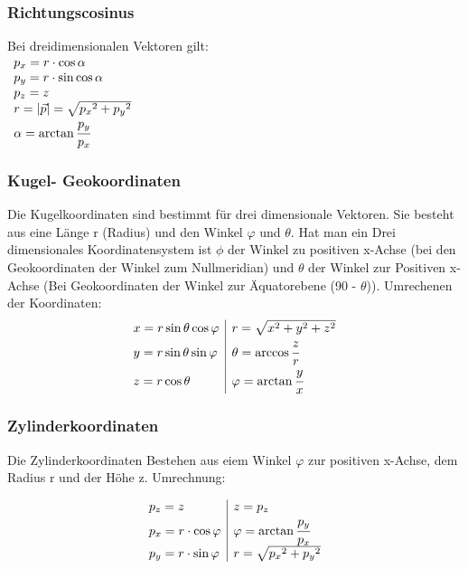 \documentclass[a4paper,10pt]{scrartcl}
\begin{document}
            \subsubsection{Richtungscosinus}
                Bei dreidimensionalen Vektoren gilt: \\
                $\begin{array}{l}
                    p_x = r \cdot \cos \alpha \\
                    p_y = r \cdot \sin \cos \alpha \\
                    p_z = z\\
                    r = |\vec p| = \sqrt{{p_x}^2 + {p_y}^2} \\
                    \alpha = \arctan \cfrac{p_y}{p_x}
                \end{array}$
            \subsubsection{Kugel- Geokoordinaten}
            Die Kugelkoordinaten sind bestimmt für drei dimensionale Vektoren. Sie besteht aus eine Länge r (Radius) und den Winkel $\varphi$ und $\theta$. Hat man ein Drei dimensionales
            Koordinatensystem ist $\phi$ der Winkel zu positiven x-Achse (bei den Geokoordinaten der Winkel zum Nullmeridian) und $\theta$ der Winkel zur Positiven x-Achse 
            (Bei Geokoordinaten der Winkel zur Äquatorebene (90 - $\theta$)). Umrechenen der Koordinaten:
            \[
                \begin{array}{l|l}
                    x = r \sin \theta \cos \varphi & r = \sqrt{x^2 + y^2 + z^2} \\
                    y = r \sin \theta \sin \varphi & \theta = \arccos \cfrac{z}{r} \\
                    z = r \cos \theta & \varphi = \arctan \cfrac{y}{x}
                \end{array}
            \]
            \subsubsection{Zylinderkoordinaten}
            Die Zylinderkoordinaten Bestehen aus eiem Winkel $\varphi$ zur positiven x-Achse, dem Radius r und der Höhe z. Umrechnung:

            \[
                \begin{array}{l|l}
                    p_z = z & z = p_z \\
                    p_x = r \cdot \cos \varphi &  \varphi = \arctan \cfrac{p_y}{p_x} \\
                    p_y = r \cdot \sin \varphi & r = \sqrt{{p_x}^2 + {p_y}^2}  
                \end{array}
            \]
            \newpage
\end{document}
